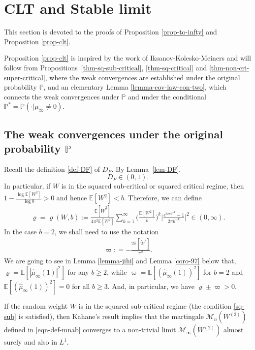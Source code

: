 \documentclass[12pt]{amsart}
\theoremstyle{definition}
\theoremstyle{remark}
\newcommand{\E}{\mathbb{E}}
\newcommand{\PP}{\mathbb{P}}
\newcommand{\MAB}{\mathscr{M}_{n}(W^{(2)})}
\numberwithin{equation}{section}
\begin{document}
\section{CLT and Stable limit}\label{sec-clt}
This section is devoted to the proofs of Proposition \ref{prop-to-infty} and Proposition \ref{prop-clt}. 

Proposition \ref{prop-clt} is inspired by the work of     Iksanov-Kolesko-Meiners \cite{Iksanov} and  will follow from  Propositions~\ref{thm-sq-sub-critical}, \ref{thm-sq-critical} and \ref{thm-non-cri-super-critical}, where the weak convergences are established under the original probability $\PP$,  and an elementary  Lemma \ref{lemma-cov-law-con-two}, which connects the weak convergences under $\PP$ and under the conditional $\PP^* = \PP(\cdot |\mu_\infty\ne 0)$. 

 

 
 
 \subsection{The weak convergences under the original probability $\PP$}


 
Recall the definition \eqref{def-DF} of $D_F$.  By Lemma~\ref{lem-DF}, 
\[
D_F \in (0,1).
\]
In particular,   if  $W$ is in the squared sub-critical or squared critical regime, then  $1- \frac{\log \E[W^2]}{\log b}>0$ and hence $\E[W^2]<b$. Therefore,  we can define
 \begin{align}\label{eqn-c-c-c-c}
 \varrho=\varrho(W,b):=\frac{\E[\mathring{W}^2]}{4\pi^2\E[W^2]}\sum_{k=1}^\infty \Big(\frac{\E[W^2]}{b}\Big)^{k}\Big|\frac{e^{i2\pi b^{-k}}-1}{2\pi  b^{-k}}\Big|^2\in (0,\infty).
 \end{align}
In the case $b = 2$, we shall need to use the notation 
\begin{align}\label{def-pi}
\varpi: = 
- \frac{2 \E[\mathring{W}^2]}{\pi^2}. 
\end{align}
We are going to see in Lemma \ref{lemma-jihi} and Lemma \ref{coro-97} below that, $\varrho= \E[|\widehat{\mu}_\infty(1)|^2]$ for any $b \ge 2$, while  $\varpi = \E[(\widehat{\mu}_\infty(1))^2]$ for $b = 2$ and $\E[(\widehat{\mu}_\infty(1))^2] =0$ for all $b \ge 3$.  And, in particular, we have $\varrho \pm \varpi>0$. 

 
 
If  the random weight $W$ is in the squared sub-critical regime (the condition \eqref{sq-sub} is satisfied), then Kahane's result  \cite[Theorem 2]{Kahane-Peyriere-advance}  implies that the martingale $\MAB$ defined in \eqref{eqn-def-mnab}
converges to a non-trivial limit $\mathscr{M}_\infty(W^{(2)})$ almost surely and also  in $L^1$. 
\end{document}
